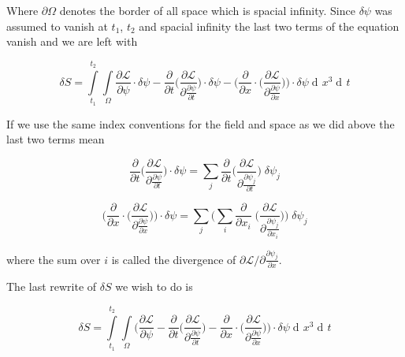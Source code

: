 \documentclass{article}
\DeclareMathOperator{\dd}{d\!}
\begin{document}
Where $\partial \Omega$ denotes the border of all space which is spacial infinity. Since $\delta \psi$ was assumed to vanish at $t_1$, $t_2$ and spacial infinity the last two terms of the equation vanish and we are left with

\begin{equation}
\delta S = \int\limits_{t_1}^{t_2} \int\limits_{\Omega} 
\frac{\partial \mathcal{L}}{\partial \psi} \cdot \delta \psi
-\frac{\partial}{\partial t} \bigg( \frac{\partial \mathcal{L}}{\partial \frac{\partial \psi}{\partial t}} \bigg) \cdot \delta \psi
-\bigg(\frac{\partial}{\partial x} \cdot \bigg( \frac{\partial \mathcal{L}}{\partial \frac{\partial \psi}{\partial x}} \bigg)\bigg) \cdot \delta \psi
\dd x^3 \dd t
\end{equation}

If we use the same index conventions for the field and space as we did above the last two terms mean

\begin{equation}
\frac{\partial}{\partial t} \bigg( \frac{\partial \mathcal{L}}{\partial \frac{\partial \psi}{\partial t}} \bigg) \cdot \delta \psi
= \sum_j \frac{\partial}{\partial t} \bigg( \frac{\partial \mathcal{L}}{\partial \frac{\partial \psi_j}{\partial t}} \bigg) \; \delta \psi_j
\end{equation}

\begin{equation}
\bigg(\frac{\partial}{\partial x} \cdot \bigg( \frac{\partial \mathcal{L}}{\partial \frac{\partial \psi}{\partial x}} \bigg)\bigg) \cdot \delta \psi
= \sum_j \bigg(\sum_i \frac{\partial}{\partial x_i} \; \bigg( \frac{\partial \mathcal{L}}{\partial \frac{\partial \psi_j}{\partial x_i}} \bigg)\bigg) \; \delta \psi_j
\end{equation}

where the sum over $i$ is called the divergence of $\partial \mathcal{L} / \partial \frac{\partial \psi_j}{\partial x}$.

The last rewrite of $\delta S$ we wish to do is 

\begin{equation}
\delta S = \int\limits_{t_1}^{t_2} \int\limits_{\Omega} 
\bigg(
\frac{\partial \mathcal{L}}{\partial \psi}
-\frac{\partial}{\partial t} \bigg( \frac{\partial \mathcal{L}}{\partial \frac{\partial \psi}{\partial t}} \bigg) 
-\frac{\partial}{\partial x} \cdot \bigg( \frac{\partial \mathcal{L}}{\partial \frac{\partial \psi}{\partial x}} \bigg)\bigg) \cdot \delta \psi
\dd x^3 \dd t
\end{equation}
\end{document}
